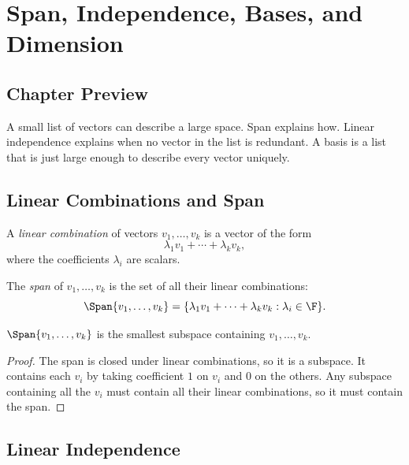 \chapter{Span, Independence, Bases, and Dimension}
\label{ch:span-bases-dimension}

\section*{Chapter Preview}

A small list of vectors can describe a large space. Span explains how. Linear
independence explains when no vector in the list is redundant. A basis is a
list that is just large enough to describe every vector uniquely.

\section{Linear Combinations and Span}

\begin{definition}
  A \emph{linear combination} of vectors $v_1,\ldots,v_k$ is a vector of the
  form
  \[
    \lambda_1v_1+\cdots+\lambda_kv_k,
  \]
  where the coefficients $\lambda_i$ are scalars.
\end{definition}

\begin{definition}
  The \emph{span} of $v_1,\ldots,v_k$ is the set of all their linear
  combinations:
  \[
    \Span\{v_1,\ldots,v_k\}
    =
    \{\lambda_1v_1+\cdots+\lambda_kv_k:\lambda_i\in\F\}.
  \]
\end{definition}

\begin{proposition}
  $\Span\{v_1,\ldots,v_k\}$ is the smallest subspace containing
  $v_1,\ldots,v_k$.
\end{proposition}

\begin{proof}
  The span is closed under linear combinations, so it is a subspace. It
  contains each $v_i$ by taking coefficient $1$ on $v_i$ and $0$ on the
  others. Any subspace containing all the $v_i$ must contain all their linear
  combinations, so it must contain the span.
\end{proof}

\section{Linear Independence}


